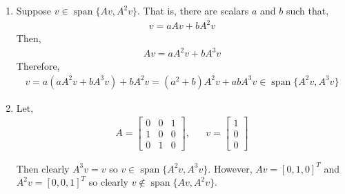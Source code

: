 \documentclass[10pt]{article}
\begin{document}
\begin{solution}[Solution]
\begin{enumerate}[label=(\alph*)]
    \item Suppose \( v\in\operatorname{span}\{Av,A^2v\} \). That is, there are scalars \( a \) and \( b \) such that,
        \begin{align*}
            v = aAv+bA^2v
        \end{align*}
        Then,
        \begin{align*}
            Av = aA^2v + bA^3v
        \end{align*}
        Therefore,
        \begin{align*}
            v = a(aA^2v+bA^3v)+bA^2v = (a^2+b)A^2v+abA^3v \in\operatorname{span}\{A^2v,A^3v\} \tag*{\qed}
        \end{align*}
        
    \item 
        Let,
        \begin{align*}
            A = \left[\begin{array}{ccc}
            0 & 0 & 1 \\
            1 & 0 & 0 \\
            0 & 1 & 0
            \end{array}\right]
            ,&&
            v = \left[\begin{array}{c}1 \\ 0 \\ 0\end{array}\right]
        \end{align*}
        
        Then clearly \( A^3v = v \) so \( v\in\operatorname{span}\{A^2v,A^3v\} \). However, \( Av = [0,1,0]^T \) and \( A^2v = [0,0,1]^T \) so clearly \( v\notin\operatorname{span}\{Av,A^2v\} \).



\end{enumerate}
  
\end{solution}
\end{document}
